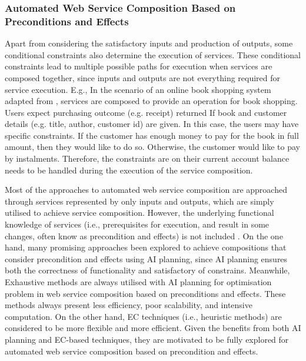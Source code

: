 \subsubsection{Automated Web Service Composition Based on Preconditions and Effects}
Apart from considering the satisfactory inputs and production of outputs, some conditional constraints also determine the execution of services.  These conditional constraints lead to multiple possible paths for execution when services are composed together, since inputs and outputs are not everything required for service execution. E.g., In the scenario of an online book shopping system adapted from \cite{wang2014automated}, services are composed to provide an operation for book shopping.  Users expect purchasing outcome (e.g. receipt) returned If book and customer details (e.g. title, author, customer id) are given. In this case, the users may have specific constraints. If the customer has enough money to pay for the book in full amount, then they would like to do so. Otherwise, the customer would like to pay by instalments. Therefore, the constraints are on their current account balance needs to be handled during the execution of the service composition.

Most of the approaches to automated web service composition are approached through services represented by only inputs and outputs, which are simply utilised to achieve service composition. However, the underlying functional knowledge of services (i.e., prerequisites for execution, and result in some changes, often know as precondition and effects) is not included \cite{paliwal2012semantics}. On the one hand, many promising approaches \cite{DBLP:journals/soca/BoustilMS14} been explored to achieve compositions that consider precondition and effects using AI planning, since AI planning ensures both the correctness of functionality and satisfactory of constrains. Meanwhile, Exhaustive methods are always utilised with AI planning for optimisation problem in web service composition based on preconditions and effects. These methods always present less efficiency, poor scalability, and intensive computation. On the other hand, EC techniques (i.e., heuristic methods) are considered to be more flexible and more efficient. Given the benefits from both AI planning and EC-based techniques, they are motivated to be fully explored for automated web service composition based on precondition and effects.
 
